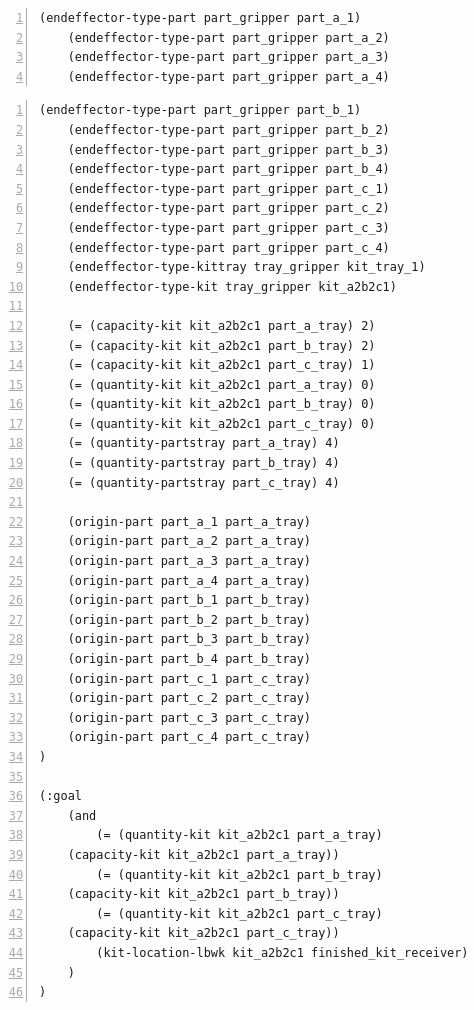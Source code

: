 \begin{center}
\begin{minipage}{.9\paperwidth}
\begin{mylisting}
\begin{Verbatim}[commandchars=\\\{\},fontsize=\scriptsize, numbers=left, numbersep=2pt]
    (endeffector-type-part part_gripper part_a_1)
    (endeffector-type-part part_gripper part_a_2)
    (endeffector-type-part part_gripper part_a_3)
    (endeffector-type-part part_gripper part_a_4)
\end{Verbatim}
\end{mylisting}
\end{minipage}

\begin{minipage}{.5\paperwidth}
\begin{mylisting}
\begin{Verbatim}[commandchars=\\\{\},fontsize=\scriptsize,  firstnumber=continue, numbers=left, numbersep=2pt]	
    (endeffector-type-part part_gripper part_b_1)
    (endeffector-type-part part_gripper part_b_2)
    (endeffector-type-part part_gripper part_b_3)
    (endeffector-type-part part_gripper part_b_4)
    (endeffector-type-part part_gripper part_c_1)
    (endeffector-type-part part_gripper part_c_2)
    (endeffector-type-part part_gripper part_c_3)
    (endeffector-type-part part_gripper part_c_4)
    (endeffector-type-kittray tray_gripper kit_tray_1)
    (endeffector-type-kit tray_gripper kit_a2b2c1)

    (= (capacity-kit kit_a2b2c1 part_a_tray) 2)
    (= (capacity-kit kit_a2b2c1 part_b_tray) 2)
    (= (capacity-kit kit_a2b2c1 part_c_tray) 1)
    (= (quantity-kit kit_a2b2c1 part_a_tray) 0)
    (= (quantity-kit kit_a2b2c1 part_b_tray) 0)
    (= (quantity-kit kit_a2b2c1 part_c_tray) 0)
    (= (quantity-partstray part_a_tray) 4)
    (= (quantity-partstray part_b_tray) 4)
    (= (quantity-partstray part_c_tray) 4)

    (origin-part part_a_1 part_a_tray)
    (origin-part part_a_2 part_a_tray)
    (origin-part part_a_3 part_a_tray)
    (origin-part part_a_4 part_a_tray)
    (origin-part part_b_1 part_b_tray)
    (origin-part part_b_2 part_b_tray)
    (origin-part part_b_3 part_b_tray)
    (origin-part part_b_4 part_b_tray)
    (origin-part part_c_1 part_c_tray)
    (origin-part part_c_2 part_c_tray)
    (origin-part part_c_3 part_c_tray)
    (origin-part part_c_4 part_c_tray)
)

(:goal
    (and
        (= (quantity-kit kit_a2b2c1 part_a_tray)
	(capacity-kit kit_a2b2c1 part_a_tray))
        (= (quantity-kit kit_a2b2c1 part_b_tray)
	(capacity-kit kit_a2b2c1 part_b_tray))
        (= (quantity-kit kit_a2b2c1 part_c_tray)
	(capacity-kit kit_a2b2c1 part_c_tray))
        (kit-location-lbwk kit_a2b2c1 finished_kit_receiver)
    )
)
\end{Verbatim}
\end{mylisting}
\end{minipage}
\end{center}

